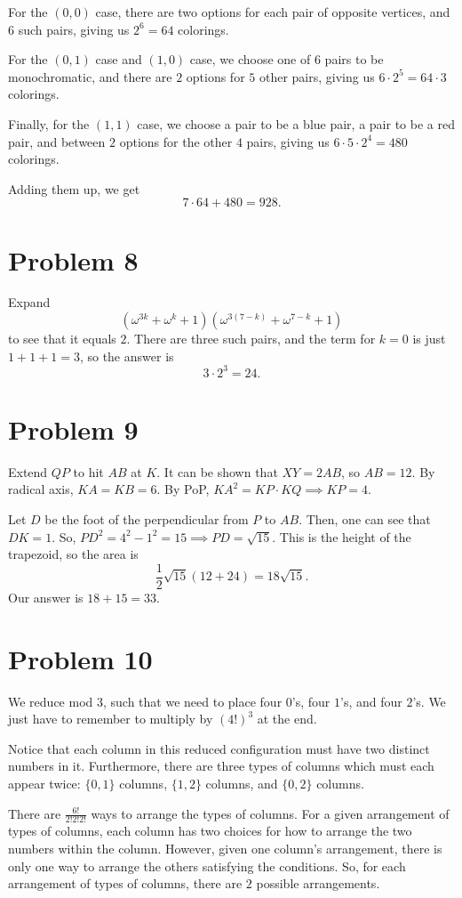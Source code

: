 \documentclass{scrartcl}
\begin{document}
For the $(0,0)$ case, there are two options for each pair of opposite vertices,
and $6$ such pairs, giving us $2^6 = 64$ colorings.

For the $(0,1)$ case and $(1,0)$ case, we choose one of $6$ pairs to be monochromatic, and
there are $2$ options for $5$ other pairs, giving us $6 \cdot 2^5 = 64 \cdot 3$ colorings.

Finally, for the $(1,1)$ case, we choose a pair to be a blue pair, a pair to be a red pair,
and between $2$ options for the other $4$ pairs, giving us $6 \cdot 5 \cdot 2^4 = 480$ colorings.

Adding them up, we get
\[ 7 \cdot 64 + 480 = \boxed{928}. \]

\section*{Problem 8}
Expand
\[ (\omega^{3k} + \omega^{k} + 1)(\omega^{3(7-k)} + \omega^{7-k} + 1) \]
to see that it equals $2$.
There are three such pairs, and the term for $k=0$ is just $1+1+1=3$,
so the answer is
\[ 3 \cdot 2^3 = \boxed{24}. \]

\section*{Problem 9}
Extend $QP$ to hit $AB$ at $K$.
It can be shown that $XY = 2AB$, so $AB = 12$.
By radical axis, $KA = KB = 6$.
By PoP, $KA^2 = KP \cdot KQ \implies KP = 4$.

Let $D$ be the foot of the perpendicular from $P$ to $AB$.
Then, one can see that $DK = 1$.
So, $PD^2 = 4^2 - 1^2 = 15 \implies PD = \sqrt{15}$.
This is the height of the trapezoid, so the area is
\[ \frac12 \sqrt{15} (12 + 24) = 18\sqrt{15}. \]
Our answer is $18 + 15 = \boxed{33}$.

\section*{Problem 10}
We reduce mod $3$, such that we need to place four $0$'s, four $1$'s, and four $2$'s.
We just have to remember to multiply by $(4!)^3$ at the end.

Notice that each column in this reduced configuration
must have two distinct numbers in it.
Furthermore, there are three types of columns which must each appear twice:
$\{0,1\}$ columns, $\{1,2\}$ columns, and $\{0,2\}$ columns.

There are $\frac{6!}{2!2!2!}$ ways to arrange the types of columns.
For a given arrangement of types of columns, each column has two choices
for how to arrange the two numbers within the column.
However, given one column's arrangement, there is only one way to arrange the
others satisfying the conditions.
So, for each arrangement of types of columns, there are $2$ possible arrangements.
\end{document}
